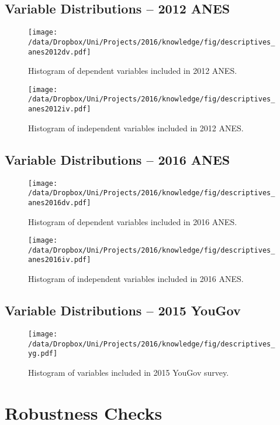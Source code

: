\clearpage
\subsection{Variable Distributions -- 2012 ANES}
\begin{figure}[h]\centering
\texttt{[image: /data/Dropbox/Uni/Projects/2016/knowledge/fig/descriptives\_anes2012dv.pdf]}
\caption{Histogram of dependent variables included in 2012 ANES.}\label{fig:descriptives_anes2012dv}
\end{figure}

\begin{figure}[h]\centering
\texttt{[image: /data/Dropbox/Uni/Projects/2016/knowledge/fig/descriptives\_anes2012iv.pdf]}
\caption{Histogram of independent variables included in 2012 ANES.}\label{fig:descriptives_anes2012iv}
\end{figure}

\clearpage
\subsection{Variable Distributions -- 2016 ANES}
\begin{figure}[h]\centering
\texttt{[image: /data/Dropbox/Uni/Projects/2016/knowledge/fig/descriptives\_anes2016dv.pdf]}
\caption{Histogram of dependent variables included in 2016 ANES.}\label{fig:descriptives_anes2016dv}
\end{figure}

\begin{figure}[h]\centering
\texttt{[image: /data/Dropbox/Uni/Projects/2016/knowledge/fig/descriptives\_anes2016iv.pdf]}
\caption{Histogram of independent variables included in 2016 ANES.}\label{fig:descriptives_anes2016iv}
\end{figure}

\clearpage
\subsection{Variable Distributions -- 2015 YouGov}

\begin{figure}[h]\centering
\texttt{[image: /data/Dropbox/Uni/Projects/2016/knowledge/fig/descriptives\_yg.pdf]}
\caption{Histogram of variables included in 2015 YouGov survey.}\label{fig:descriptives_yg}
\end{figure}


\clearpage
\section{Robustness Checks}
\renewcommand\thefigure{D.\arabic{figure}}
\renewcommand\thetable{D.\arabic{table}}
\setcounter{figure}{0}
\setcounter{table}{0}

